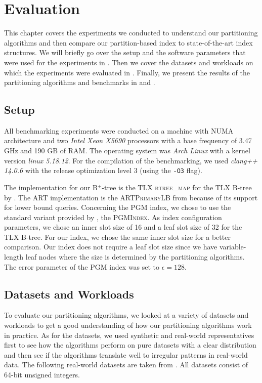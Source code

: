 \thispagestyle{plain}
\chapter{Evaluation}\label{sec:evaluation}

This chapter covers the experiments we conducted to understand our partitioning algorithms and then compare our partition-based index to state-of-the-art index structures. We will briefly go over the setup and the software parameters that were used for the experiments in . Then we cover the datasets and workloads on which the experiments were evaluated in . Finally, we present the results of the partitioning algorithms and benchmarks in  and .

\section{Setup}\label{sec:setup}
All benchmarking experiments were conducted on a machine with NUMA architecture and two \textit{Intel Xeon X5690} processors with a base frequency of 3.47 GHz and 190 GB of RAM. The operating system was \textit{Arch Linux} with a kernel version \textit{linux 5.18.12}. For the compilation of the benchmarking, we used \textit{clang++ 14.0.6} with the release optimization level 3 (using the \verb|-O3| flag).

The implementation for our B$^+$-tree is the \textsc{TLX btree\_map} for the TLX B-tree by \citeauthor{TLX} \cite{TLX}. The ART implementation is the \textsc{ARTPrimaryLB} from \citeauthor{sosd-vldb} \cite{sosd-vldb} because of its support for lower bound queries. Concerning the PGM index, we chose to use the standard variant provided by \citeauthor{Ferragina:2020pgm} \cite{Ferragina:2020pgm}, the \textsc{PGMIndex}. As index configuration parameters, we chose an inner slot size of 16 and a leaf slot size of 32 for the TLX B-tree. For our index, we chose the same inner slot size for a better comparison. Our index does not require a leaf slot size since we have variable-length leaf nodes where the size is determined by the partitioning algorithms. The error parameter of the PGM index was set to $\epsilon = 128$.

\section{Datasets and Workloads}\label{sec:datasets}

To evaluate our partitioning algorithms, we looked at a variety of datasets and workloads to get a good understanding of how our partitioning algorithms work in practice. As for the datasets, we used synthetic and real-world representatives first to see how the algorithms perform on pure datasets with a clear distribution and then see if the algorithms translate well to irregular patterns in real-world data. The following real-world datasets are taken from \citeauthor{Kipf2019} \cite{Kipf2019}. All datasets consist of 64-bit unsigned integers.

